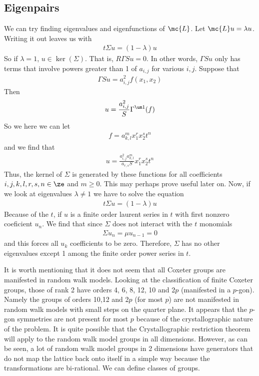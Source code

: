 \subsection{Eigenpairs}
We can try finding eigenvalues and eigenfunctions of $\mc{L}$. Let $\mc{L}u = \lambda u$. Writing it out leaves us with
\begin{align}
	t\Sigma u = (1-\lambda)u
\end{align}
So if $\lambda = 1$, $u\in \ker(\Sigma)$. That is, $R\Gamma S u = 0$. In other words, $\Gamma S u$ only has terms that involve powers greater than 1 of $a_{i,j}$ for various $i,j$. Suppose that
\begin{align}
	\Gamma S u = a_{i,j}^2 f(x_1,x_2)
\end{align}
Then
\begin{align}
	u  = \frac{a_{i,j}^2}{S}\Gamma^{\um 1}(f)
\end{align}
So we here we can let
\begin{align}
		f = a_{k,l}^m x_1^rx_2^s t^n
\end{align}
and we find that
\begin{align}
	u =  \frac{a_{i,j}^2 a_{k,l}^m}{a_{r,s}S}x_1^r x_2^s t^n
\end{align}
Thus, the kernel of $\Sigma$ is generated by these functions for all coefficients $i,j,k,l,r,s,n \in \ze$ and $m\ge 0$. This may perhaps prove useful later on. Now, if we look at eigenvalues $\lambda \neq 1$ we have to solve the equation
\begin{align}
	t \Sigma u = (1-\lambda) u
\end{align}
Because of the $t$, if $u$ is a finite order laurent series in $t$ with first nonzero coeficient $u_n$. We find that since $\Sigma$ does not interact with the $t$ monomials
\begin{align}
	\Sigma u_n = \mu u_{n-1} = 0
\end{align}
and this forces all $u_k$ coefficients to be zero. Therefore, $\Sigma$ has no other eigenvalues except 1 among the finite order power series in $t$.


It is worth mentioning that it does not seem that all Coxeter groups are manifested in random walk models. Looking at the classification of finite Coxeter groups, those of rank 2 have orders 4, 6, 8, 12, 10 and 2$p$ (manifested in a $p$-gon). Namely the groups of orders 10,12 and 2$p$ (for most $p$) are not manifested in random walk models with small steps on the quarter plane. It appears that the $p$-gon symmetries are not present for most $p$ because of the crystallographic nature of the problem. It is quite possible that the Crystallographic restriction theorem will apply to the random walk model groups in all dimensions. However, as can be seen, a lot of random walk model groups in 2 dimensions have generators that do not map the lattice back onto itself in a simple way because the transformations are bi-rational. We can define classes of groups.

